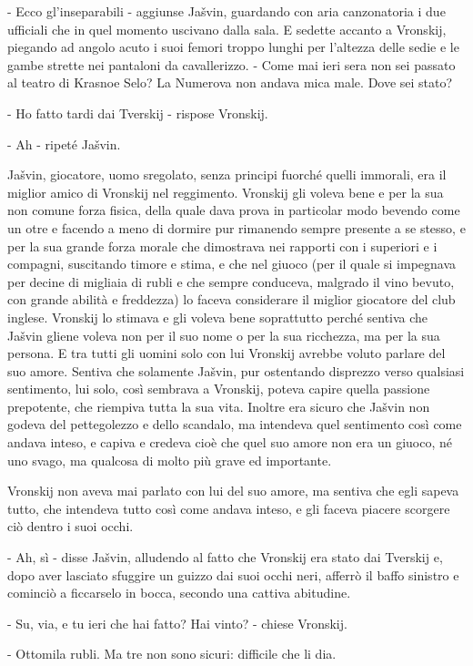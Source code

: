 - Ecco gl'inseparabili - aggiunse Jašvin, guardando con aria canzonatoria i due ufficiali che in quel momento uscivano dalla sala. E sedette accanto a Vronskij, piegando ad angolo acuto i suoi femori troppo lunghi per l'altezza delle sedie e le gambe strette nei pantaloni da cavallerizzo. - Come mai ieri sera non sei passato al teatro di Krasnoe Selo? La Numerova non andava mica male. Dove sei stato? 

- Ho fatto tardi dai Tverskij - rispose Vronskij. 

- Ah - ripeté Jašvin. 

Jašvin, giocatore, uomo sregolato, senza principi fuorché quelli immorali, era il miglior amico di Vronskij nel reggimento. Vronskij gli voleva bene e per la sua non comune forza fisica, della quale dava prova in particolar modo bevendo come un otre e facendo a meno di dormire pur rimanendo sempre presente a se stesso, e per la sua grande forza morale che dimostrava nei rapporti con i superiori e i compagni, suscitando timore e stima, e che nel giuoco (per il quale si impegnava per decine di migliaia di rubli e che sempre conduceva, malgrado il vino bevuto, con grande abilità e freddezza) lo faceva considerare il miglior giocatore del club inglese. Vronskij lo stimava e gli voleva bene soprattutto perché sentiva che Jašvin gliene voleva non per il suo nome o per la sua ricchezza, ma per la sua persona. E tra tutti gli uomini solo con lui Vronskij avrebbe voluto parlare del suo amore. Sentiva che solamente Jašvin, pur ostentando disprezzo verso qualsiasi sentimento, lui solo, così sembrava a Vronskij, poteva capire quella passione prepotente, che riempiva tutta la sua vita. Inoltre era sicuro che Jašvin non godeva del pettegolezzo e dello scandalo, ma intendeva quel sentimento così come andava inteso, e capiva e credeva cioè che quel suo amore non era un giuoco, né uno svago, ma qualcosa di molto più grave ed importante. 

Vronskij non aveva mai parlato con lui del suo amore, ma sentiva che egli sapeva tutto, che intendeva tutto così come andava inteso, e gli faceva piacere scorgere ciò dentro i suoi occhi. 

- Ah, sì - disse Jašvin, alludendo al fatto che Vronskij era stato dai Tverskij e, dopo aver lasciato sfuggire un guizzo dai suoi occhi neri, afferrò il baffo sinistro e cominciò a ficcarselo in bocca, secondo una cattiva abitudine. 

- Su, via, e tu ieri che hai fatto? Hai vinto? - chiese Vronskij. 

- Ottomila rubli. Ma tre non sono sicuri: difficile che li dia. 

